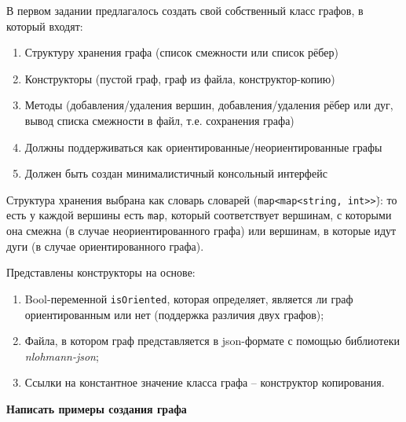 \documentclass[otchet]{SCWorks}
\begin{document}
В первом задании предлагалось создать свой собственный класс графов, в который входят:

\begin{enumerate}
\item Структуру хранения графа (список смежности или список рёбер)
\item Конструкторы (пустой граф, граф из файла, конструктор-копию)
\item Методы (добавления/удаления вершин, добавления/удаления рёбер или дуг, вывод списка смежности в файл, т.е. сохранения графа)
\item Должны поддерживаться как ориентированные/неориентированные графы
\item Должен быть создан минималистичный консольный интерфейс
\end{enumerate}

Структура хранения выбрана как словарь словарей (\texttt{map<map<string, int>\.>}): то есть у каждой вершины есть \texttt{map}, который соответствует вершинам, с которыми она смежна (в случае неориентированного графа) или вершинам, в которые идут дуги (в случае ориентированного графа). 

Представлены конструкторы на основе:
\begin{enumerate}
\item Bool-переменной \texttt{isOriented}, которая определяет, является ли граф ориентированным или нет (поддержка различия двух графов);
\item Файла, в котором граф представляется в json-формате с помощью библиотеки \textit{nlohmann-json};
\item Ссылки на константное значение класса графа -- конструктор копирования.
\end{enumerate}

\textbf{Написать примеры создания графа}
\end{document}
